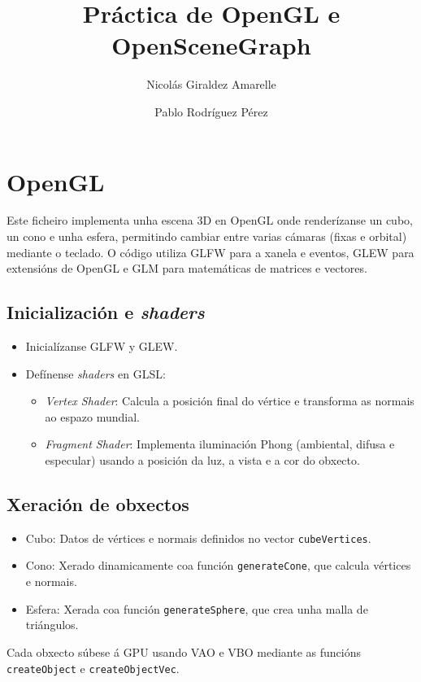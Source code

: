 \documentclass{article}
\title{Práctica de OpenGL e OpenSceneGraph}
\author{Nicolás Giraldez Amarelle \and Pablo Rodríguez Pérez}
\begin{document}
\maketitle

\section{OpenGL}

Este ficheiro implementa unha escena 3D en OpenGL onde renderízanse un cubo, un cono e unha esfera, permitindo cambiar entre varias cámaras (fixas e orbital) mediante o teclado. O código utiliza GLFW para a xanela e eventos, GLEW para extensións de OpenGL e GLM para matemáticas de matrices e vectores.

\subsection{Inicialización e \textit{shaders}}

\begin{itemize}
	\item Inicialízanse GLFW y GLEW.
	\item Defínense \textit{shaders} en GLSL:
		\begin{itemize}
			\item \textit{Vertex Shader}: Calcula a posición final do vértice e transforma as normais ao espazo mundial.
			\item \textit{Fragment Shader}: Implementa iluminación Phong (ambiental, difusa e especular) usando a posición da luz, a vista e a cor do obxecto.
		\end{itemize}
\end{itemize}

\subsection{Xeración de obxectos}

\begin{itemize}
	\item Cubo: Datos de vértices e normais definidos no vector \texttt{cubeVertices}.
	\item Cono: Xerado dinamicamente coa función \texttt{generateCone}, que calcula vértices e normais.
	\item Esfera: Xerada coa función \texttt{generateSphere}, que crea unha malla de triángulos.
\end{itemize}

Cada obxecto súbese á GPU usando VAO e VBO mediante as funcións \texttt{createObject} e \texttt{createObjectVec}.
\end{document}
